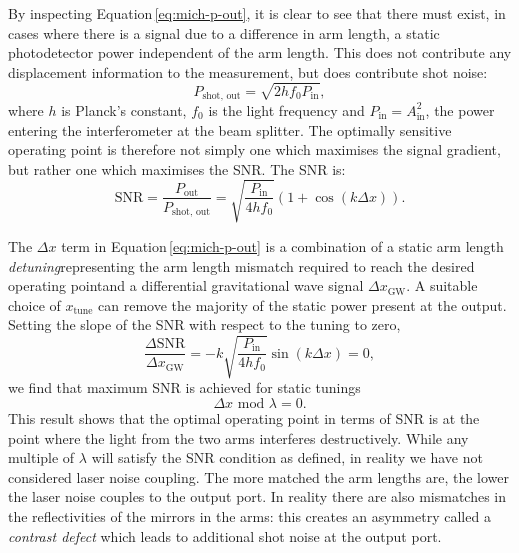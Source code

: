 By inspecting Equation\,\ref{eq:mich-p-out}, it is clear to see that there must exist, in cases where there is a signal due to a difference in arm length, a static photodetector power independent of the arm length. This does not contribute any displacement information to the measurement, but does contribute shot noise:
\begin{equation}
  P_{\text{shot, out}} = \sqrt{2 h f_0 P_{\text{in}}},
\end{equation}
where $h$ is Planck's constant, $f_0$ is the light frequency and $P_{\text{in}} = A_{\text{in}}^2$, the power entering the interferometer at the beam splitter. The optimally sensitive operating point is therefore not simply one which maximises the signal gradient, but rather one which maximises the SNR. The SNR is:
\begin{equation}
  \text{SNR} = \frac{P_{\text{out}}}{P_{\text{shot, out}}} = \sqrt{\frac{P_{\text{in}}}{4 h f_0}} \left( 1 + \cos \left(k \Delta x \right) \right).
\end{equation}

The $\Delta x$ term in Equation\,\ref{eq:mich-p-out} is a combination of a static arm length \emph{detuning}\textemdash representing the arm length mismatch required to reach the desired operating point\textemdash and a differential gravitational wave signal $\Delta x_{\text{GW}}$. A suitable choice of $ x_{\text{tune}}$ can remove the majority of the static power present at the output. Setting the slope of the SNR with respect to the tuning to zero,
\begin{equation}
  \frac{\Delta \text{SNR}}{\Delta x_{\text{GW}}} = -k \sqrt{\frac{P_{\text{in}}}{4 h f_0}} \sin \left(k \Delta x\right) = 0,
\end{equation}
we find that maximum SNR is achieved for static tunings 
\begin{equation}
  \Delta x \text{ mod } \lambda = 0.
\end{equation}
This result shows that the optimal operating point in terms of SNR is at the point where the light from the two arms interferes destructively. While any multiple of $\lambda$ will satisfy the SNR condition as defined, in reality we have not considered laser noise coupling. The more matched the arm lengths are, the lower the laser noise couples to the output port. In reality there are also mismatches in the reflectivities of the mirrors in the arms: this creates an asymmetry called a \emph{contrast defect} which leads to additional shot noise at the output port.

